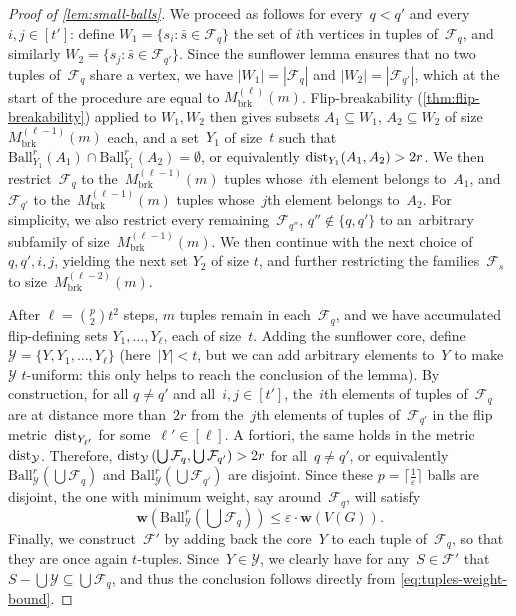 \documentclass[a4paper,UKenglish,cleveref, autoref, thm-restate]{lipics-v2021}
\newcommand{\eps}{\varepsilon}
\newcommand{\YY}{\mathcal{Y}}
\renewcommand{\subset}{\subseteq}
\newcommand{\dist}{\textnormal{dist}}
\newcommand{\ceil}[1]{\lceil #1 \rceil}
\newcommand{\weight}{\mathbf{w}}
\newcommand{\FF}{\mathcal{F}}
\renewcommand{\le}{\leqslant}
\renewcommand{\leq}{\le}
\newcommand{\Ball}{\mathrm{Ball}}
\begin{document}
\begin{proof}[Proof of \cref{lem:small-balls}]
    We proceed as follows for every~$q < q'$ and every $i,j \in [t']$:
    define $W_1 = \{s_i \colon \bar{s} \in \FF_q\}$ the set of $i$th vertices in tuples of~$\FF_q$, and similarly $W_2 = \{s_j \colon \bar{s} \in \FF_{q'}\}$.
    Since the sunflower lemma ensures that no two tuples of~$\FF_q$ share a vertex,
    we have $|W_1| = |\FF_q|$ and $|W_2| = |\FF_{q'}|$, which at the start of the procedure are equal to $M_{\text{brk}}^{(\ell)}(m)$.
    Flip-breakability (\cref{thm:flip-breakability}) applied to $W_1, W_2$ then gives subsets $A_1 \subset W_1$, $A_2 \subset W_2$ of size~$M_{\text{brk}}^{(\ell-1)}(m)$ each,
    and a set~$Y_1$ of size~$t$ such that $\Ball_{Y_1}^r(A_1) \cap \Ball_{Y_1}^r(A_2) = \emptyset$, or equivalently $\dist_{Y_1}(A_1,A_2) > 2r$.
    We then restrict~$\FF_q$ to the~$M_{\text{brk}}^{(\ell-1)}(m)$ tuples whose~$i$th element belongs to~$A_1$, and $\FF_{q'}$ to the~$M_{\text{brk}}^{(\ell-1)}(m)$ tuples whose~$j$th element belongs to~$A_2$.
    For simplicity, we also restrict every remaining~$\FF_{q''}$, $q'' \not\in \{q,q'\}$ to an~arbitrary subfamily of size~$M_{\text{brk}}^{(\ell-1)}(m)$.
    We then continue with the next choice of~$q,q',i,j$, yielding the next set $Y_2$ of size $t$, and further restricting the families~$\FF_s$ to size~$M_{\text{brk}}^{(\ell-2)}(m)$.

    After $\ell = \binom{p}{2} t^2$ steps, $m$ tuples remain in each~$\FF_q$, and we have accumulated flip-defining sets $Y_1,\dots,Y_\ell$, each of size~$t$.
    Adding the sunflower core, define $\YY = \{Y,Y_1,\dots,Y_\ell\}$
    (here~$|Y| < t$, but we can add arbitrary elements to~$Y$ to make~$\YY$ $t$-uniform: this only helps to reach the conclusion of the lemma).
    By construction, for all $q \neq q'$ and all~$i,j \in [t']$, the~$i$th elements of tuples of~$\FF_q$ are at distance more than~$2r$ from the~$j$th elements of tuples of~$\FF_{q'}$ in the flip metric~$\dist_{Y_{\ell'}}$ for some~$\ell' \in [\ell]$.
    A fortiori, the same holds in the metric~$\dist_\YY$.
    Therefore, $\dist_\YY\left(\bigcup \FF_q, \bigcup \FF_{q'}\right) > 2r$ for all~$q \neq q'$,
    or equivalently $\Ball_\YY^r(\bigcup \FF_q)$ and $\Ball_\YY^r(\bigcup \FF_{q'})$ are disjoint.
    Since these $p = \ceil{\frac{1}{\eps}}$ balls are disjoint, the one with minimum weight, say around~$\FF_q$, will satisfy
    \begin{equation}
        \weight(\Ball_\YY^r(\textstyle{\bigcup \FF_q})) \leq \eps \cdot \weight(V(G)).
        \label{eq:tuples-weight-bound}
    \end{equation}
    Finally, we construct~$\FF'$ by adding back the core~$Y$ to each tuple of~$\FF_q$, so that they are once again $t$-tuples.
    Since~$Y \in \YY$, we clearly have for any~$S \in \FF'$ that $S - \bigcup \YY \subseteq \bigcup \FF_q$,
    and thus the conclusion follows directly from \eqref{eq:tuples-weight-bound}.
\end{proof}
\end{document}
